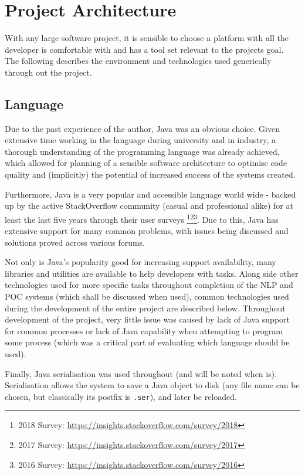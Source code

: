 \chapter{Project Architecture}
With any large software project, it is sensible to choose a platform with all the developer is comfortable with and has a tool set relevant to the projects goal. The following describes the environment and technologies used generically through out the project.

\section{Language}
Due to the past experience of the author, Java was an obvious choice. Given extensive time working in the language during university and in industry, a thorough understanding of the programming language was already achieved, which allowed for planning of a sensible software architecture to optimise code quality and (implicitly) the potential of increased success of the systems created. 

Furthermore, Java is a very popular and accessible language world wide - backed up by the active StackOverflow community (casual and professional alike) for at least the last five years through their user surveys \footnote{2018 Survey: \href{https://insights.stackoverflow.com/survey/2018}{https://insights.stackoverflow.com/survey/2018}}\footnote{2017 Survey: \href{https://insights.stackoverflow.com/survey/2017}{https://insights.stackoverflow.com/survey/2017}}\footnote{2016 Survey: \href{https://insights.stackoverflow.com/survey/2016}{https://insights.stackoverflow.com/survey/2016}}. Due to this, Java has extensive support for many common problems, with issues being discussed and solutions proved across various forums. 

Not only is Java's popularity good for increasing support availability, many libraries and utilities are available to help developers with tasks. Along side other technologies used for more specific tasks throughout completion of the NLP and POC systems (which shall be discussed when used), common technologies used during the development of the entire project are described below. Throughout development of the project, very little issue was caused by lack of Java support for common processes or lack of Java capability when attempting to program some process (which was a critical part of evaluating which language should be used). 

Finally, Java serialisation was used throughout (and will be noted when is). Serialisation allows the system to save a Java object to disk (any file name can be chosen, but classically its postfix is \texttt{.ser}), and later be reloaded. 

